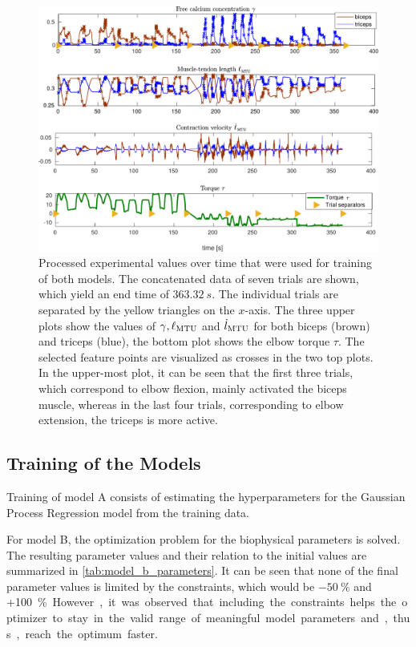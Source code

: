 \begin{figure}%
  \centering%
  \includegraphics[width=\textwidth]{images/summer_school_study/selected_points.pdf}%
  \caption{Processed experimental values over time that were used for training of both models. The concatenated data of seven trials are shown, which yield an end time of $\SI{363.32}{s}$. The individual trials are separated by the yellow triangles on the $x$-axis. The three upper plots show the values of $\gamma, \ell_{\text{MTU}}$ and $\dot{l}_{\text{MTU}}$ for both biceps (brown) and triceps (blue), the bottom plot shows the elbow torque $\tau$. The selected feature points are visualized as crosses in the two top plots. In the upper-most plot, it can be seen that the first three trials, which correspond to elbow flexion, mainly activated the biceps muscle, whereas in the last four trials, corresponding to elbow extension, the triceps is more active.
}%
  \label{fig:selected_points}%
\end{figure}%

\subsection{Training of the Models}\label{sec:res_training}
%
Training of model A consists of estimating the hyperparameters for the Gaussian Process Regression model from the training data.

For model B, the optimization problem for the biophysical parameters is solved. The resulting parameter values and their relation to the initial values are summarized in \cref{tab:model_b_parameters}. It can be seen that none of the final parameter values is limited by the constraints, which would be $\SI{-50}{\percent}$ and +\SI{100}\percent. However, it was observed that including the constraints helps the optimizer to stay in the valid range of meaningful model parameters and, thus, reach the optimum faster.

